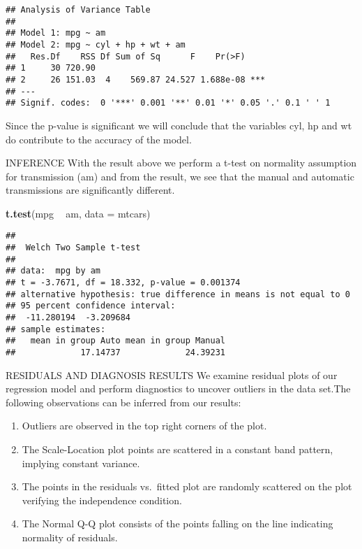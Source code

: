 \documentclass[
]{article}
\newenvironment{Shaded}{\begin{snugshade}}{\end{snugshade}}
\newcommand{\DataTypeTok}[1]{\textcolor[rgb]{0.13,0.29,0.53}{#1}}
\newcommand{\KeywordTok}[1]{\textcolor[rgb]{0.13,0.29,0.53}{\textbf{#1}}}
\newcommand{\NormalTok}[1]{#1}
\newcommand{\OperatorTok}[1]{\textcolor[rgb]{0.81,0.36,0.00}{\textbf{#1}}}
\newcommand{\StringTok}[1]{\textcolor[rgb]{0.31,0.60,0.02}{#1}}
\providecommand{\tightlist}{%
  \setlength{\itemsep}{0pt}\setlength{\parskip}{0pt}}
\begin{document}
\begin{verbatim}
## Analysis of Variance Table
## 
## Model 1: mpg ~ am
## Model 2: mpg ~ cyl + hp + wt + am
##   Res.Df    RSS Df Sum of Sq      F    Pr(>F)    
## 1     30 720.90                                  
## 2     26 151.03  4    569.87 24.527 1.688e-08 ***
## ---
## Signif. codes:  0 '***' 0.001 '**' 0.01 '*' 0.05 '.' 0.1 ' ' 1
\end{verbatim}

Since the p-value is significant we will conclude that the variables
cyl, hp and wt do contribute to the accuracy of the model.

INFERENCE With the result above we perform a t-test on normality
assumption for transmission (am) and from the result, we see that the
manual and automatic transmissions are significantly different.

\begin{Shaded}
\begin{Highlighting}[]
\KeywordTok{t.test}\NormalTok{(mpg }\OperatorTok{~}\StringTok{ }\NormalTok{am, }\DataTypeTok{data =}\NormalTok{ mtcars)}
\end{Highlighting}
\end{Shaded}

\begin{verbatim}
## 
##  Welch Two Sample t-test
## 
## data:  mpg by am
## t = -3.7671, df = 18.332, p-value = 0.001374
## alternative hypothesis: true difference in means is not equal to 0
## 95 percent confidence interval:
##  -11.280194  -3.209684
## sample estimates:
##   mean in group Auto mean in group Manual 
##             17.14737             24.39231
\end{verbatim}

RESIDUALS AND DIAGNOSIS RESULTS We examine residual plots of our
regression model and perform diagnostics to uncover outliers in the data
set.The following observations can be inferred from our results:

\begin{enumerate}
\def\labelenumi{\arabic{enumi}.}
\tightlist
\item
  Outliers are observed in the top right corners of the plot.
\item
  The Scale-Location plot points are scattered in a constant band
  pattern,\\
  implying constant variance.
\item
  The points in the residuals vs.~fitted plot are randomly scattered on
  the plot verifying the independence condition.
\item
  The Normal Q-Q plot consists of the points falling on the line
  indicating normality of residuals.
\end{enumerate}
\end{document}
